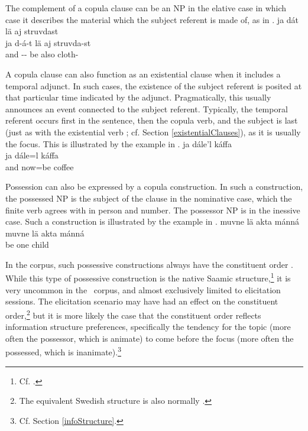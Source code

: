 The complement of a copula clause can be an NP in the elative case in which case it describes the material which the subject referent is made of, as in .
\ea\label{copula5}
\glll	ja dát lä aj struvdast\\
	ja d-á-t lä aj struvda-st\\
	and -- be\BS{} also cloth-\\\nopagebreak
{} 
\z

A copula clause can also function as an existential clause when it includes a temporal adjunct. In such cases, the existence of the subject referent is posited at that particular time indicated by the adjunct. Pragmatically, this usually announces an event connected to the subject referent. Typically, the temporal referent occurs first in the sentence, then the copula verb, and the subject is last (just as with the existential verb ; cf. Section \ref{existentialClauses}), as it is usually the focus. 
This is illustrated by the example in .
\ea\label{copulaNr}
\glll	ja dále'l káffa\\
	ja dále=l káffa\\
	and now=be\BS{} coffee\BS{}\\\nopagebreak
{} 
\z

Possession can also be expressed by a copula construction. In such a construction, the possessed NP is the subject of the clause in the nominative case, which the finite verb agrees with in person and number. The possessor NP is in the inessive case. Such a construction is illustrated by the example in .
\ea\label{copula6}
\glll	muvne lä akta mánná\\
	muvne lä akta mánná\\
	 be\BS{} one child\BS{}\\\nopagebreak
{} 
\z

In the corpus, such possessive constructions always have the constituent order 
\PLUS{}\PLUS{}. 
While this type of possessive construction is the native Saamic structure,\footnote{Cf. \citet[9]{Bergsland1977}.} 
it is very uncommon in the \PS\ corpus, and almost exclusively limited to elicitation sessions. The elicitation scenario may have had an effect on the constituent order,\footnote{The equivalent Swedish structure is also normally .} 
but it is more likely the case that the constituent order reflects information structure preferences, specifically the tendency for the topic (more often the possessor, which is animate) to come before the focus (more often the possessed, which is inanimate).\footnote{Cf. Section \ref{infoStructure}.} 

